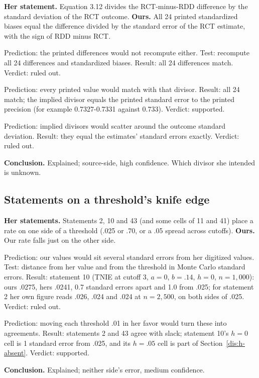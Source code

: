 \textbf{Her statement.} Equation 3.12 divides the RCT-minus-RDD difference by the standard deviation of the RCT outcome. \textbf{Ours.} All 24 printed standardized biases equal the difference divided by the standard error of the RCT estimate, with the sign of RDD minus RCT.
\begin{description}[leftmargin=1em,style=nextline]
\item[We transcribed or recomputed her tables wrongly (ours).] Prediction: the printed differences would not recompute either. Test: recompute all 24 differences and standardized biases. Result: all 24 differences match. Verdict: ruled out.
\item[Her computation used the estimate's standard error (source).] Prediction: every printed value would match with that divisor. Result: all 24 match; the implied divisor equals the printed standard error to the printed precision (for example 0.7327-0.7331 against 0.733). Verdict: supported.
\item[Rounding (neither).] Prediction: implied divisors would scatter around the outcome standard deviation. Result: they equal the estimates' standard errors exactly. Verdict: ruled out.
\end{description}
\textbf{Conclusion.} Explained; source-side, high confidence. Which divisor she intended is unknown.

\subsection{Statements on a threshold's knife edge}\label{dis:threshold-noise}

\textbf{Her statements.} Statements 2, 10 and 43 (and some cells of 11 and 41) place a rate on one side of a threshold (.025 or .70, or a .05 spread across cutoffs). \textbf{Ours.} Our rate falls just on the other side.
\begin{description}[leftmargin=1em,style=nextline]
\item[Our rates differ from hers in these cells (ours).] Prediction: our values would sit several standard errors from her digitized values. Test: distance from her value and from the threshold in Monte Carlo standard errors. Result: statement 10 (TNIE at cutoff 3, $a = 0$, $b = .14$, $h = 0$, $n = 1{,}000$): ours .0275, hers .0241, 0.7 standard errors apart and 1.0 from .025; for statement 2 her own figure reads .026, .024 and .024 at $n = 2{,}500$, on both sides of .025. Verdict: ruled out.
\item[Knife edge (neither).] Prediction: moving each threshold .01 in her favor would turn these into agreements. Result: statements 2 and 43 agree with slack; statement 10's $h = 0$ cell is 1 standard error from .025, and its $h = .05$ cell is part of Section~\ref{dis:h-absent}. Verdict: supported.
\end{description}
\textbf{Conclusion.} Explained; neither side's error, medium confidence.

